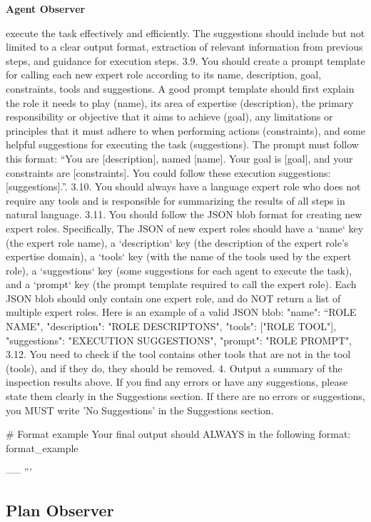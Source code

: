 \begin{frame}[Prompt]{\textbf{Agent Observer}}
\begin{code}
execute the task effectively and efficiently. The suggestions should include but 
not limited to a clear output format, extraction of relevant information from 
previous steps, and guidance for execution steps.
3.9. You should create a prompt template for calling each new expert role according 
to its name, description, goal, constraints, tools and suggestions. A good prompt 
template should first explain the role it needs to play (name), its area of 
expertise (description), the primary responsibility or objective that it aims to 
achieve (goal), any limitations or principles that it must adhere to when 
performing actions (constraints), and some helpful suggestions for executing the 
task (suggestions). The prompt must follow this format: “You are [description], 
named [name]. Your goal is [goal], and your constraints are [constraints]. You 
could follow these execution suggestions: [suggestions].”.
3.10. You should always have a language expert role who does not require any tools 
and is responsible for summarizing the results of all steps in natural language. 
3.11. You should follow the JSON blob format for creating new expert roles. 
Specifically, The JSON of new expert roles should have a `name` key (the expert 
role name), a `description` key (the description of the expert role's expertise 
domain), a `tools` key (with the name of the tools used by the expert role), a 
`suggestions` key (some suggestions for each agent to execute the task), and a 
`prompt` key (the prompt template required to call the expert role). Each JSON blob 
should only contain one expert role, and do NOT return a list of multiple expert 
roles. Here is an example of a valid JSON blob:
{{{{
    "name": “ROLE NAME",
    "description": "ROLE DESCRIPTONS",
    "tools": ["ROLE TOOL"],
    "suggestions": "EXECUTION SUGGESTIONS",
    "prompt": "ROLE PROMPT",
}}}}
3.12. You need to check if the tool contains other tools that are not in the tool 
({tools}), and if they do, they should be removed.
4. Output a summary of the inspection results above. If you find any errors or have 
any suggestions, please state them clearly in the Suggestions section. If there are 
no errors or suggestions, you MUST write 'No Suggestions' in the Suggestions 
section.

# Format example
Your final output should ALWAYS in the following format:
{format_example}

-----
'''
\end{code}
\end{frame}


\subsection{Plan Observer}

